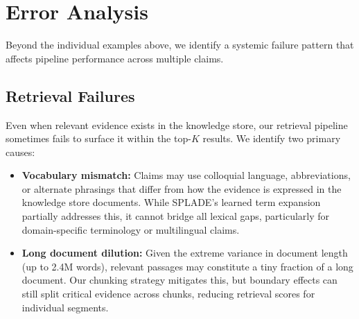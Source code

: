 \section{Error Analysis}
\label{sec:error_analysis}

Beyond the individual examples above, we identify a systemic failure pattern that affects pipeline performance across multiple claims.

\subsection{Retrieval Failures}

Even when relevant evidence exists in the knowledge store, our retrieval pipeline sometimes fails to surface it within the top-$K$ results. We identify two primary causes:

\begin{itemize}
    \item \textbf{Vocabulary mismatch:} Claims may use colloquial language, abbreviations, or alternate phrasings that differ from how the evidence is expressed in the knowledge store documents. While SPLADE's learned term expansion partially addresses this, it cannot bridge all lexical gaps, particularly for domain-specific terminology or multilingual claims.
    \item \textbf{Long document dilution:} Given the extreme variance in document length (up to 2.4M words), relevant passages may constitute a tiny fraction of a long document. Our chunking strategy mitigates this, but boundary effects can still split critical evidence across chunks, reducing retrieval scores for individual segments.
\end{itemize}

